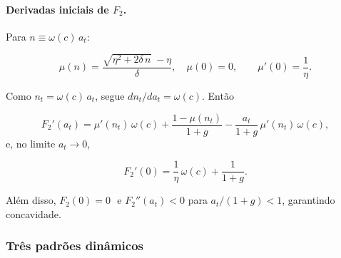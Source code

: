 \documentclass[a4paper,12pt]{article}[abntex2]
\begin{document}
\paragraph{Derivadas iniciais de $F_{2}$.}

Para $n\equiv\omega(c)\,a_t$:

\[
    \mu(n)
      =\frac{\sqrt{\eta^{2}+2\delta\,n}\;-\eta}{\delta},
    \quad
    \mu(0)=0,
    \qquad
    \mu'(0)=\frac{1}{\eta}.
\]

Como $n_t=\omega(c)\,a_t$, segue $dn_t/da_t=\omega(c)$.
Então

\[
    F_{2}'(a_t)=
        \mu'(n_t)\,\omega(c)
        +\frac{1-\mu(n_t)}{1+g}
        -\frac{a_t}{1+g}\,\mu'(n_t)\,\omega(c),
\]
e, no limite $a_t\to0$,

\[
    \boxed{F_{2}'(0)=\frac{1}{\eta}\,\omega(c)+\frac{1}{1+g}.}
    \tag{19}
\]

Além disso, $F_{2}(0)=0$ \(\tag{20}\) e $F_{2}''(a_t)<0$ para $a_t/(1+g)<1$, garantindo concavidade.

\subsubsection{\textbf{Três padrões dinâmicos}}
\end{document}

